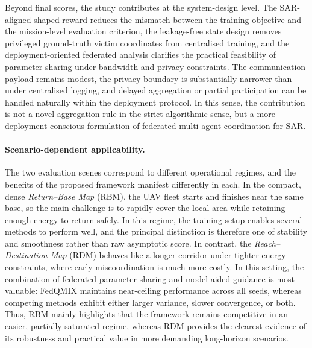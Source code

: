 \documentclass[drones,article,accept,pdftex,moreauthors]{Definitions/mdpi}
\begin{document}
Beyond final scores, the study contributes at the system-design level.
The SAR-aligned shaped reward reduces the mismatch between the training objective
and the mission-level evaluation criterion, the leakage-free state design removes
privileged ground-truth victim coordinates from centralised training, and the
deployment-oriented federated analysis clarifies the practical feasibility of
parameter sharing under bandwidth and privacy constraints. The communication
payload remains modest, the privacy boundary is substantially narrower than under
centralised logging, and delayed aggregation or partial participation can be
handled naturally within the deployment protocol. In this sense, the contribution
is not a novel aggregation rule in the strict algorithmic sense, but a more
deployment-conscious formulation of federated multi-agent coordination for SAR.

\paragraph{Scenario-dependent applicability.}
The two evaluation scenes correspond to different operational regimes, and the
benefits of the proposed framework manifest differently in each. In the compact,
dense \emph{Return--Base Map} (RBM), the UAV fleet starts and finishes near the
same base, so the main challenge is to rapidly cover the local area while
retaining enough energy to return safely. In this regime, the training setup
enables several methods to perform well, and the principal distinction is
therefore one of stability and smoothness rather than raw asymptotic score.
In contrast, the \emph{Reach--Destination Map} (RDM) behaves like a longer
corridor under tighter energy constraints, where early miscoordination is much
more costly. In this setting, the combination of federated parameter sharing and
model-aided guidance is most valuable: FedQMIX maintains near-ceiling
performance across all seeds, whereas competing methods exhibit either larger
variance, slower convergence, or both. Thus, RBM mainly highlights that the
framework remains competitive in an easier, partially saturated regime,
whereas RDM provides the clearest evidence of its robustness and practical value
in more demanding long-horizon scenarios.
\end{document}
